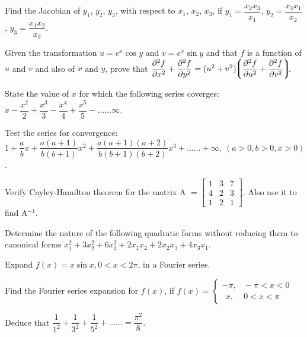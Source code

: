 \markB

\newpage \again

\partCo

\item \iitem Find the Jacobian of $y_1$, $y_2$, $y_3$, with respect to $x_1$,
  $x_2$, $x_3$, if $y_1 = \dfrac{x_2x_3}{x_1}$, $y_2 = \dfrac{x_3x_1}{x_2}$,
  $y_3 = \dfrac{x_1x_2}{x_3}$.
\Or
\item Given the transformation $u = e^x\cos y$ and $v = e^x\sin y$ and that
  $f$ is a function of $u$ and $v$ and also of $x$ and $y$, prove that
  $\dfrac{\partial^2f}{\partial x^2} + \dfrac{\partial^2f}{\partial y^2}
  = (u^2 + v^2) \!\!\left\lgroup \dfrac{\partial^2f}{\partial u^2} +
  \dfrac{\partial^2f}{\partial v^2}\right\rgroup\!\!$.
\ene

\item \iitem State the value of $x$ for which the following series coverges:
  $x - \dfrac{x^2}{2} + \dfrac{x^3}{3} - \dfrac{x^4}{4} + \dfrac{x^5}{5}
  - \ldots\ldots \infty$.
\Or
\item Test the series for convergence:
  \[ 1 + \dfrac{a}{b}x +\dfrac{a(a+1)}{b(b+1)}x^2 +
  \dfrac{a(a+1)(a+2)}{b(b+1)(b+2)}x^3 + \ldots\ldots + \infty,\  (a > 0,
  b > 0, x > 0)\].
\ene

\item \iitem Verify Cayley-Hamilton theorem for the matrix A $ =
  \begin{bmatrix}
  1 & 3 & 7\\
  4 & 2 & 3\\
  1 & 2 & 1
  \end{bmatrix}$\!. Also use it to find A$^{-1}$.
\Or
\item Determine the nature of the following quadratic forms without reducing
  them to canonical forms $x_1^2 + 3x_2^2 + 6x_3^2 + 2x_1x_2 + 2x_2x_3 + 4x_3x_1$.
\ene

\item \iitem Expand $f(x) = x\sin x, 0 < x < 2\pi$, in a Fourier series.
\Or
\item Find the Fourier series expansion for $f(x)$, if $f (x) =
  \begin{cases}
  -\pi, & \! -\pi < x < 0\\
  \ \ x, & \! 0 < x < \pi
  \end{cases}$

  Deduce that $\dfrac{1}{1^2} + \dfrac{1}{3^2} + \dfrac{1}{5^2} + \ldots\ldots
  = \dfrac{\pi^2}{8}$.
\ene
\markC
\ene

\newpage

